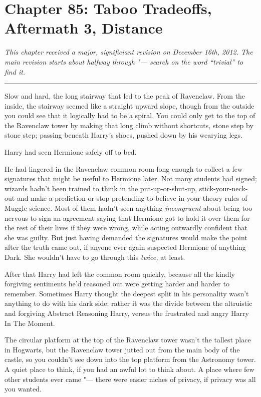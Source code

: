 \chapter{Chapter 85: Taboo Tradeoffs, Aftermath 3, Distance}
\emph{This chapter received a major, significiant revision on December
16th, 2012. The main revision starts about halfway through "--- search on
the word ``trivial'' to find it.}

\begin{center}\rule{3in}{0.4pt}\end{center}

Slow and hard, the long stairway that led to the peak of Ravenclaw. From
the inside, the stairway seemed like a straight upward slope, though
from the outside you could see that it logically had to be a spiral. You
could only get to the top of the Ravenclaw tower by making that long
climb without shortcuts, stone step by stone step; passing beneath
Harry's shoes, pushed down by his wearying legs.

Harry had seen Hermione safely off to bed.

He had lingered in the Ravenclaw common room long enough to collect a
few signatures that might be useful to Hermione later. Not many students
had signed; wizards hadn't been trained to think in the
put-up-or-shut-up,
stick-your-neck-out-and-make-a-prediction-or-stop-pretending-to-believe-in-your-theory
rules of Muggle science. Most of them hadn't seen anything
\emph{incongruent} about being too nervous to sign an agreement saying
that Hermione got to hold it over them for the rest of their lives if
they were wrong, while acting outwardly confident that she was guilty.
But just having demanded the signatures would make the point after the
truth came out, if anyone ever again suspected Hermione of anything
Dark. She wouldn't have to go through this \emph{twice,} at least.

After that Harry had left the common room quickly, because all the
kindly forgiving sentiments he'd reasoned out were getting harder and
harder to remember. Sometimes Harry thought the deepest split in his
personality wasn't anything to do with his dark side; rather it was the
divide between the altruistic and forgiving Abstract Reasoning Harry,
versus the frustrated and angry Harry In The Moment.

The circular platform at the top of the Ravenclaw tower wasn't the
tallest place in Hogwarts, but the Ravenclaw tower jutted out from the
main body of the castle, so you couldn't see down into the top platform
from the Astronomy tower. A quiet place to think, if you had an awful
lot to think about. A place where few other students ever came "--- there
were easier niches of privacy, if privacy was all you wanted.

